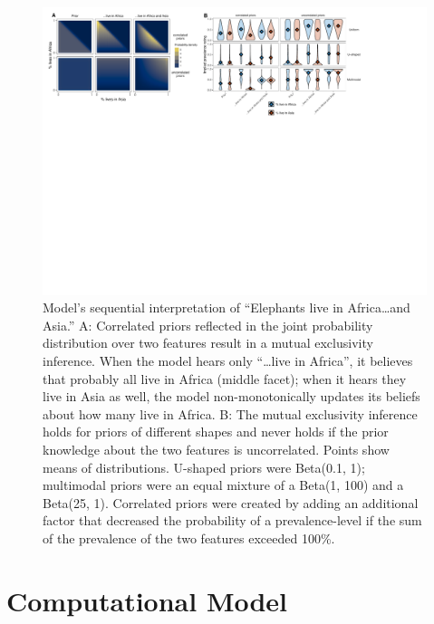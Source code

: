 \documentclass[10pt,letterpaper]{article}
\begin{document}
\begin{figure}[t]
  \centering
    \includegraphics[width=1\textwidth]{model}
  \caption{Model's sequential interpretation of ``Elephants live in Africa\ldots and Asia.'' A: Correlated priors reflected in the joint probability distribution over two features result in a mutual exclusivity inference. When the model hears only ``\ldots live in Africa'', it believes that probably all live in Africa (middle facet); when it hears they live in Asia as well, the model non-monotonically updates its beliefs about how many live in Africa. B: The mutual exclusivity inference holds for priors of different shapes and never holds if the prior knowledge about the two features is uncorrelated. Points show means of distributions. U-shaped priors were Beta(0.1, 1); multimodal priors were an equal mixture of a Beta(1, 100) and a Beta(25, 1). Correlated priors were created by adding an additional factor that decreased the probability of a prevalence-level if the sum of the prevalence of the two features exceeded 100\%. }
  \label{fig:model}
\end{figure}


\section{Computational Model}
\end{document}
